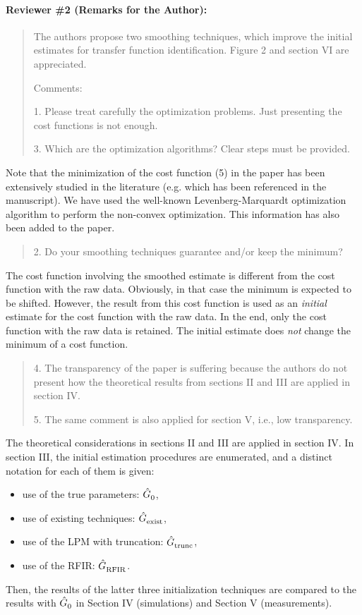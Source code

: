 
\newcommand{\reviewer}[1]{\paragraph{#1}}

\reviewer{Reviewer \#2 (Remarks for the Author):}
\begin{quote}
The authors propose two smoothing techniques, which improve the initial estimates for transfer function identification. Figure 2 and section VI are appreciated. 

Comments: 

1. Please treat carefully the optimization problems. Just presenting the cost functions is not enough. 

3. Which are the optimization algorithms? Clear steps must be provided. 
\end{quote}
Note that the minimization of the cost function (5) in the paper has been extensively studied in the literature (e.g. \cite[Section 9.11]{Pintelon2001} which has been referenced in the manuscript).
We have used the well-known Levenberg-Marquardt optimization algorithm to perform the non-convex optimization.
This information has also been added to the paper.

\begin{quote}
2. Do your smoothing techniques guarantee and/or keep the minimum? 
\end{quote}
The cost function involving the smoothed estimate is different from the cost function with the raw data. 
Obviously, in that case the minimum is expected to be shifted.
However, the result from this cost function is used as an \emph{initial} estimate for the cost function with the raw data. 
In the end, only the cost function with the raw data is retained.
The initial estimate does \emph{not} change the minimum of a cost function.

\begin{quote}
4. The transparency of the paper is suffering because the authors do not present how the theoretical results from sections II and III are applied in section IV. 

5. The same comment is also applied for section V, i.e., low transparency. 
\end{quote}

The theoretical considerations in sections II and III are applied in section IV.
In section III, the initial estimation procedures are enumerated, and a distinct notation for each of them is given:
\begin{itemize}
  \item use of the true parameters: $\hat{G}_{\mathrm{0}}^{\mathrm{}}$,
  \item use of existing techniques: $\hat{G}_{\mathrm{exist}}^{\mathrm{}}$,
  \item use of the LPM with truncation: $\hat{G}_{\mathrm{trunc}}^{\mathrm{}}$,
  \item use of the RFIR: $\hat{G}_{\mathrm{RFIR}}^{\mathrm{}}$.
\end{itemize}
Then, the results of the latter three initialization techniques are compared to the results with $\hat{G}_{\mathrm{0}}^{\mathrm{}}$ in Section IV (simulations) and Section V (measurements).

